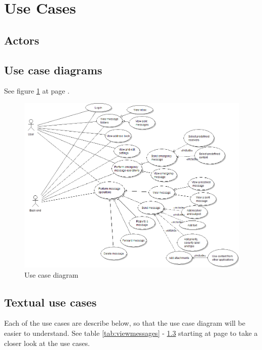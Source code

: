 \section{Use Cases}

\subsection{Actors}

\subsection{Use case diagrams}
See figure \ref{fig:usecase} at page \pageref{fig:usecase}.

\begin{figure}
\begin{center}
\includegraphics[width=\textwidth]{kpro-use-case}
\caption{Use case diagram} \label{fig:usecase}
\end{center}
\end{figure}

\subsection{Textual use cases}
Each of the use cases are describe below, so that the use case diagram will be easier to understand. See table \ref{tab:viewmessages} - \ref{} starting at page \pageref{tab:viewmessages} to take a closer look at the use cases.


